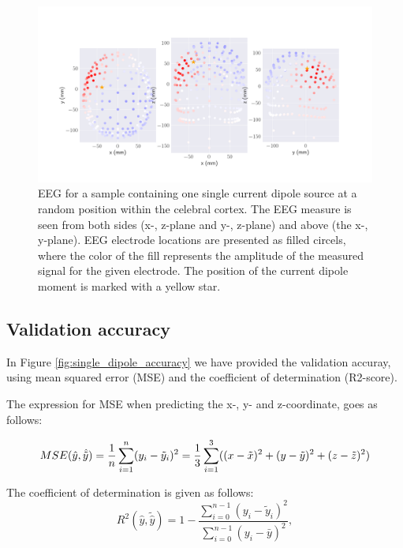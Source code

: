 \documentclass[a4paper, UKenglish, 11pt]{uiomaster}
\begin{document}
\begin{figure}[!htb]
    \centering
    \includegraphics[width=\linewidth]{../Code/plots/finals/eeg_field_1_1.png}
    \caption{EEG for a sample containing one single current dipole source at a random position within the celebral cortex. The EEG measure is seen from both sides (x-, z-plane and y-, z-plane) and above (the x-, y-plane). EEG electrode locations are presented as filled circels, where the color of the fill represents the amplitude of the measured signal for the given electrode. The position of the current dipole moment is marked with a yellow star.}
    \label{fig:eeg_field_1_dipole_example}
\end{figure}

\subsection{Validation accuracy}
In Figure \ref{fig:single_dipole_accuracy} we have provided the validation accuray, using mean squared error (MSE) and the coefficient of determination (R2-score).

The expression for MSE when predicting the x-, y- and z-coordinate, goes as follows:

\begin{equation}
MSE(\hat{y},\hat{\tilde{y}}) = \frac{1}{n}
\sum_{i=1}^{n}(y_i-\tilde{y}_i)^2 \\
= \frac{1}{3}\sum_{i=1}^{3}((x-\tilde{x})^2 + (y-\tilde{y})^2 + (z-\tilde{z})^2 )
\label{eq:MSE}
\end{equation}

The coefficient of determination is given as follows:
\begin{equation}
R^2(\hat{y}, \tilde{\hat{y}}) = 1 - \frac{\sum_{i=0}^{n - 1} (y_i - \tilde{y}_i)^2}{\sum_{i=0}^{n - 1} (y_i - \bar{y})^2},
\label{eq:R2}
\end{equation}
\end{document}
